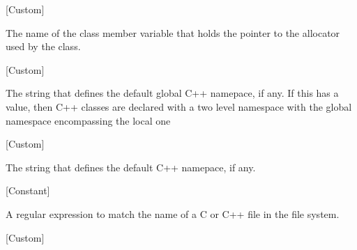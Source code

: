 \vspace{1em}
\noindent
{}
\usebox{\funcname}
 \hfill [Custom]

\begin{doc-string}
The name of the class member variable that holds the pointer to the allocator
used by the class.
\end{doc-string}

\vspace{1em}
\noindent
{}
\usebox{\funcname}
 \hfill [Custom]

\begin{doc-string}
The string that defines the default global C++ namepace, if any.
If this has a value, then C++ classes are declared with a two level
namespace with the global namespace encompassing the local one
\end{doc-string}

\vspace{1em}
\noindent
{}
\usebox{\funcname}
 \hfill [Custom]

\begin{doc-string}
The string that defines the default C++ namepace, if any.
\end{doc-string}

\vspace{1em}
\noindent
{}
\usebox{\funcname}
 \hfill [Constant]

\begin{doc-string}
A regular expression to match the name of a C or C++ file in the file system.
\end{doc-string}

\vspace{1em}
\noindent
{}
\usebox{\funcname}
 \hfill [Custom]

